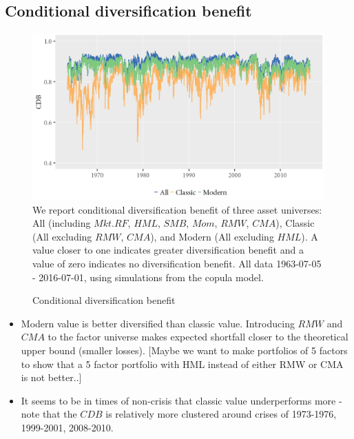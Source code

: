 \subsection{Conditional diversification benefit}
\begin{figure}[H]
  \caption{Conditional diversification benefit}
  \label{diag:cdb1}
  \centering
  \begin{minipage}{\textwidth}
  \includegraphics[scale=1]{graphics/CDB_dynamic_ghskt.png}  
  \vspace{3mm}
  \footnotesize
  We report conditional diversification benefit of three asset universes: All (including $Mkt.RF$, $HML$, $SMB$, $Mom$, $RMW$, $CMA$), Classic (All excluding $RMW$, $CMA$), and Modern (All excluding $HML$). A value closer to one indicates greater diversification benefit and a value of zero indicates no diversification benefit. All data 1963-07-05 - 2016-07-01, using simulations from the copula model.
  \end{minipage}
\end{figure}
\begin{itemize}
  \item Modern value is better diversified than classic value. Introducing $RMW$ and $CMA$ to the factor universe makes expected shortfall closer to the theoretical upper bound (smaller losses). [Maybe we want to make portfolios of 5 factors to show that a 5 factor portfolio with HML instead of either RMW or CMA is not better..]
  \item It seems to be in times of non-crisis that classic value underperforms more - note that the $CDB$ is relatively more clustered around crises of 1973-1976, 1999-2001, 2008-2010.
\end{itemize}
